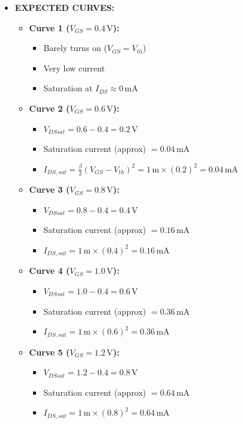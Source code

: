 \documentclass[a4paper,12pt]{article}
\begin{document}
\begin{itemize}
  \item \textbf{EXPECTED CURVES:}
  \begin{itemize}
    \item \textbf{Curve 1 ($V_{GS} = 0.4\,\text{V}$):}
      \begin{itemize}
        \item Barely turns on ($V_{GS} = V_{th}$)
        \item Very low current
        \item Saturation at $I_{DS} \approx 0\,\text{mA}$
      \end{itemize}

    \item \textbf{Curve 2 ($V_{GS} = 0.6\,\text{V}$):}
      \begin{itemize}
        \item $V_{DSsat} = 0.6 - 0.4 = 0.2\,\text{V}$
        \item Saturation current (approx) $= 0.04\,\text{mA}$
        \item $I_{DS,sat} = \frac{\beta}{2}(V_{GS} - V_{th})^2 = 1\,\text{m} \times (0.2)^2 = 0.04\,\text{mA}$
      \end{itemize}

    \item \textbf{Curve 3 ($V_{GS} = 0.8\,\text{V}$):}
      \begin{itemize}
        \item $V_{DSsat} = 0.8 - 0.4 = 0.4\,\text{V}$
        \item Saturation current (approx) $= 0.16\,\text{mA}$
        \item $I_{DS,sat} = 1\,\text{m} \times (0.4)^2 = 0.16\,\text{mA}$
      \end{itemize}

    \item \textbf{Curve 4 ($V_{GS} = 1.0\,\text{V}$):}
      \begin{itemize}
        \item $V_{DSsat} = 1.0 - 0.4 = 0.6\,\text{V}$
        \item Saturation current (approx) $= 0.36\,\text{mA}$
        \item $I_{DS,sat} = 1\,\text{m} \times (0.6)^2 = 0.36\,\text{mA}$
      \end{itemize}

    \item \textbf{Curve 5 ($V_{GS} = 1.2\,\text{V}$):}
      \begin{itemize}
        \item $V_{DSsat} = 1.2 - 0.4 = 0.8\,\text{V}$
        \item Saturation current (approx) $= 0.64\,\text{mA}$
        \item $I_{DS,sat} = 1\,\text{m} \times (0.8)^2 = 0.64\,\text{mA}$
      \end{itemize}


\end{itemize}
\end{itemize}
\end{document}
